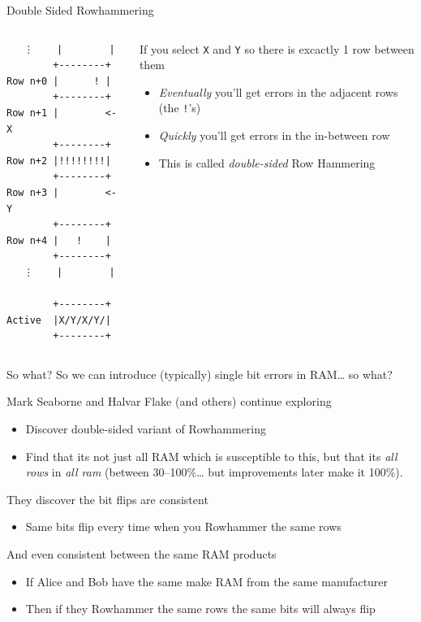 \documentclass[9pt,aspectratio=169]{beamer}
\begin{document}
\begin{frame}[label={sec:org7f3cb5f},fragile]{Double Sided Rowhammering}
 \begin{columns}
\begin{column}[t]{0.2\columnwidth}
\begin{verbatim}
   ⋮    |        |
        +--------+
Row n+0 |      ! |
        +--------+
Row n+1 |        <- X
        +--------+
Row n+2 |!!!!!!!!| 
        +--------+
Row n+3 |        <- Y 
        +--------+
Row n+4 |   !    |   
        +--------+
   ⋮    |        |

        +--------+
Active  |X/Y/X/Y/|
        +--------+
\end{verbatim}
\end{column}

\begin{column}[t]{0.79\columnwidth}
If you select \texttt{X} and \texttt{Y} so there is excactly 1 row between them
\begin{itemize}
\item \emph{Eventually} you'll get errors in the adjacent rows (the \texttt{!}'s)
\item \emph{Quickly} you'll get errors in the in-between row
\item This is called \emph{double-sided} Row Hammering
\end{itemize}
\end{column}
\end{columns}
\end{frame}

\begin{frame}[label={sec:orgf674be7}]{So what?}
So we can introduce (typically) single bit errors in RAM\ldots{} so what?

\begin{block}{Mark Seaborne and Halvar Flake (and others) continue exploring}
\begin{itemize}
\item Discover double-sided variant of Rowhammering
\item Find that its not just all RAM which is susceptible to this, but that its \emph{all rows} in \emph{all ram} (between 30--100\%\ldots{} but improvements later make it 100\%).
\end{itemize}

They discover the bit flips are consistent
\begin{itemize}
\item Same bits flip every time when you Rowhammer the same rows
\end{itemize}

And even consistent between the same RAM products
\begin{itemize}
\item If Alice and Bob have the same make RAM from the same manufacturer
\item Then if they Rowhammer the same rows the same bits will always flip
\end{itemize}
\end{block}
\end{frame}
\end{document}
